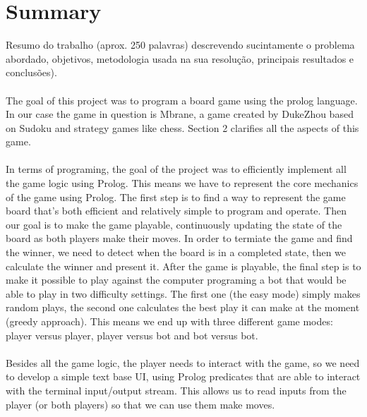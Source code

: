 \documentclass[a4paper]{article}
\begin{document}
\newpage

\section*{Summary}
Resumo do trabalho (aprox. 250 palavras) descrevendo sucintamente o problema abordado, objetivos, metodologia usada na sua resolução, principais resultados e conclusões).

\paragraph{} 
The goal of this project was to program a board game using the prolog language. In our case the game in question is Mbrane, a 
game created by DukeZhou based on Sudoku and strategy games like chess. Section 2 clarifies all the aspects of this game.

\paragraph{}
In terms of programing, the goal of the project was to efficiently implement all the game logic using Prolog.  This means we have to
represent the core mechanics of the game using Prolog. The first step is to find a way to represent the game board that's both 
efficient and relatively simple to program and operate. Then our goal is to make the game playable, continuously updating the state of
the board as both players make their moves. In order to termiate the game and find the winner, we need to detect when the board is in a completed 
state, then we calculate the winner and present it. After the game is playable, the final step is to make it possible to play against the computer 
programing a bot that would be able to play in two difficulty settings. The first one (the easy mode) simply makes random plays, the second 
one calculates the best play it can make at the moment (greedy approach). This means we end up with three different game modes: player versus player,
player versus bot and bot versus bot. 

\paragraph{}
Besides all the game logic, the player needs to interact with the game, so we need to develop a simple text base UI, using
Prolog predicates that are able to interact with the terminal input/output stream. This allows us to read inputs from the
player (or both players) so that we can use them make moves.
\end{document}
